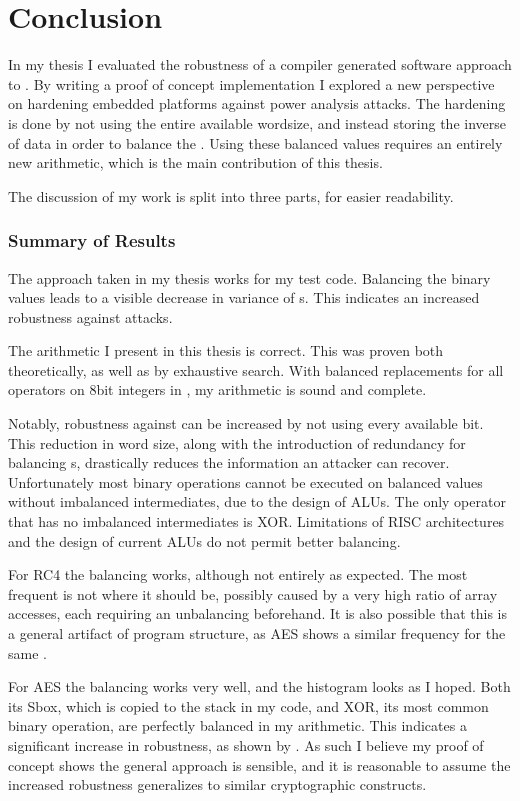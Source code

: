 \section{Conclusion}
\label{conclusion}
In my thesis I evaluated the robustness of a compiler generated software approach to \dual{}.
By writing a proof of concept implementation I explored a new perspective on hardening embedded platforms against power analysis attacks.
The hardening is done by not using the entire available wordsize, and instead storing the inverse of data in order to balance the \hammingw{}.
Using these balanced values requires an entirely new arithmetic, which is the main contribution of this thesis.

The discussion of my work is split into three parts, for easier readability.

\subsubsection{Summary of Results}
The approach taken in my thesis works for my test code.
Balancing the binary values leads to a visible decrease in variance of \hammingw{}s.
This indicates an increased robustness against \poweranalysis{} attacks.

The arithmetic I present in this thesis is correct.
This was proven both theoretically, as well as by exhaustive search.
With balanced replacements for all operators on 8bit integers in \ir{}, my arithmetic is sound and complete.

Notably, robustness against \poweranalysis{} can be increased by not using every available bit.
This reduction in word size, along with the introduction of redundancy for balancing \hammingw{}s, drastically reduces the information an attacker can recover.
Unfortunately most binary operations cannot be executed on balanced values without imbalanced intermediates, due to the design of ALUs.
The only operator that has no imbalanced intermediates is XOR.
Limitations of RISC architectures and the design of current ALUs do not permit better balancing.

For RC4 the balancing works, although not entirely as expected.
The most frequent \hammingw{} is not where it should be, possibly caused by a very high ratio of array accesses, each requiring an unbalancing beforehand.
It is also possible that this is a general artifact of program structure, as AES shows a similar frequency for the same \hammingw{}.

For AES the balancing works very well, and the histogram looks as I hoped.
Both its Sbox, which is copied to the stack in my code, and XOR, its most common binary operation, are perfectly balanced in my arithmetic.
This indicates a significant increase in robustness, as shown by .
As such I believe my proof of concept shows the general approach is sensible, and it is reasonable to assume the increased robustness generalizes to similar cryptographic constructs.

